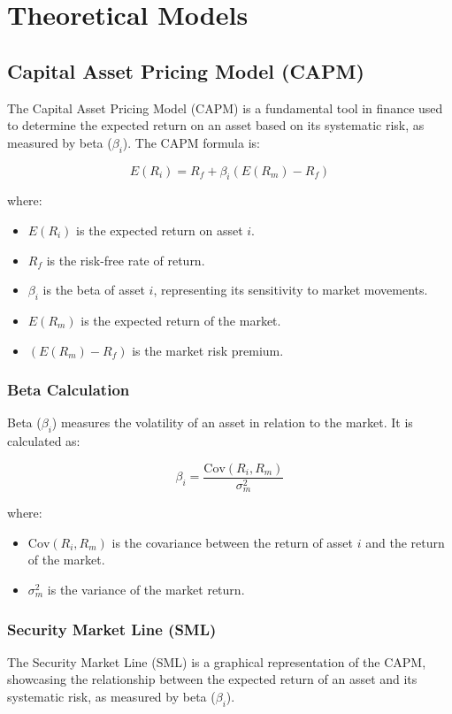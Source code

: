 \section{Theoretical Models}

\subsection{Capital Asset Pricing Model (CAPM)}
The Capital Asset Pricing Model (CAPM) is a fundamental tool in finance used to determine the expected return on an asset based on its systematic risk, as measured by beta ($\beta_i$). The CAPM formula is:

\begin{equation}
E(R_i) = R_f + \beta_i(E(R_m) - R_f)
\end{equation}

where:
\begin{itemize}
    \item $E(R_i)$ is the expected return on asset $i$.
    \item $R_f$ is the risk-free rate of return.
    \item $\beta_i$ is the beta of asset $i$, representing its sensitivity to market movements.
    \item $E(R_m)$ is the expected return of the market.
    \item $(E(R_m) - R_f)$ is the market risk premium.
\end{itemize}



\subsubsection{Beta Calculation}
Beta ($\beta_i$) measures the volatility of an asset in relation to the market. It is calculated as:

\begin{equation}
\beta_i = \frac{\text{Cov}(R_i, R_m)}{\sigma^2_m}
\end{equation}

where:
\begin{itemize}
    \item $\text{Cov}(R_i, R_m)$ is the covariance between the return of asset $i$ and the return of the market.
    \item $\sigma^2_m$ is the variance of the market return.
\end{itemize}



\subsubsection{Security Market Line (SML)}
The Security Market Line (SML) is a graphical representation of the CAPM, showcasing the relationship between the expected return of an asset and its systematic risk, as measured by beta ($\beta_i$).

